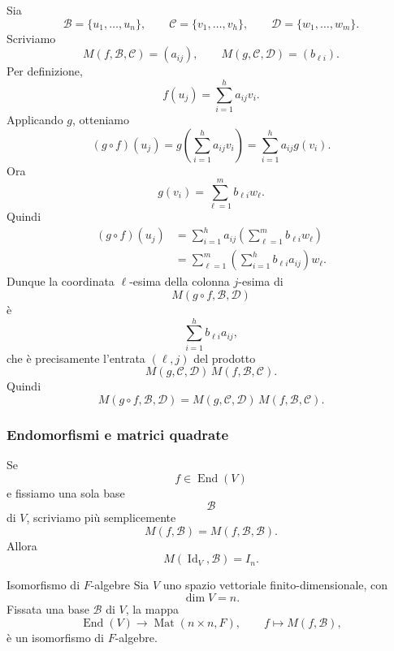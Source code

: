 \documentclass[a4paper]{article}
\begin{document}
\begin{snippetproof}{}
    Sia
    \[
        \mathcal{B}=\{u_1,\ldots,u_n\},
        \qquad
        \mathcal{C}=\{v_1,\ldots,v_h\},
        \qquad
        \mathcal{D}=\{w_1,\ldots,w_m\}.
    \]
    Scriviamo
    \[
        M(f,\mathcal{B},\mathcal{C})=(a_{ij}),
        \qquad
        M(g,\mathcal{C},\mathcal{D})=(b_{\ell i}).
    \]
    Per definizione,
    \[
        f(u_j)=\sum_{i=1}^{h}a_{ij}v_i.
    \]
    Applicando \(g\), otteniamo
    \[
        (g\circ f)(u_j)
        =
        g\left(\sum_{i=1}^{h}a_{ij}v_i\right)
        =
        \sum_{i=1}^{h}a_{ij}g(v_i).
    \]
    Ora
    \[
        g(v_i)=\sum_{\ell=1}^{m}b_{\ell i}w_\ell.
    \]
    Quindi
    \begin{align*}
        (g\circ f)(u_j)
        &=
        \sum_{i=1}^{h}a_{ij}
        \left(
            \sum_{\ell=1}^{m}b_{\ell i}w_\ell
        \right)\\
        &=
        \sum_{\ell=1}^{m}
        \left(
            \sum_{i=1}^{h}b_{\ell i}a_{ij}
        \right)w_\ell.
    \end{align*}
    Dunque la coordinata \(\ell\)-esima della colonna \(j\)-esima di
    \[
        M(g\circ f,\mathcal{B},\mathcal{D})
    \]
    è
    \[
        \sum_{i=1}^{h}b_{\ell i}a_{ij},
    \]
    che è precisamente l'entrata \((\ell,j)\) del prodotto
    \[
        M(g,\mathcal{C},\mathcal{D})\,M(f,\mathcal{B},\mathcal{C}).
    \]
    Quindi
    \[
        M(g\circ f,\mathcal{B},\mathcal{D})
        =
        M(g,\mathcal{C},\mathcal{D})\,M(f,\mathcal{B},\mathcal{C}).
    \]
\end{snippetproof}

\subsubsection{Endomorfismi e matrici quadrate}

Se
\[
    f\in\operatorname{End}(V)
\]
e fissiamo una sola base
\[
    \mathcal{B}
\]
di \(V\), scriviamo più semplicemente
\[
    M(f,\mathcal{B})
    =
    M(f,\mathcal{B},\mathcal{B}).
\]
Allora
\[
    M(\operatorname{Id}_V,\mathcal{B})=I_n.
\]

\begin{snippetproposition}{Isomorfismo di \(F\)-algebre}
    Sia \(V\) uno spazio vettoriale finito-dimensionale, con
    \[
        \dim V=n.
    \]
    Fissata una base \(\mathcal{B}\) di \(V\), la mappa
    \[
        \operatorname{End}(V)\to \operatorname{Mat}(n\times n,F),
        \qquad
        f\mapsto M(f,\mathcal{B}),
    \]
    è un isomorfismo di \(F\)-algebre.
\end{snippetproposition}
\end{document}
